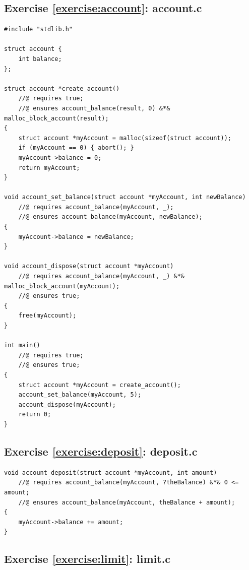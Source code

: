 \documentclass{article}
\begin{document}
\subsection{Exercise \ref{exercise:account}: account.c}

\begin{lstlisting}
#include "stdlib.h"

struct account {
    int balance;
};

struct account *create_account()
    //@ requires true;
    //@ ensures account_balance(result, 0) &*& malloc_block_account(result);
{
    struct account *myAccount = malloc(sizeof(struct account));
    if (myAccount == 0) { abort(); }
    myAccount->balance = 0;
    return myAccount;
}

void account_set_balance(struct account *myAccount, int newBalance)
    //@ requires account_balance(myAccount, _);
    //@ ensures account_balance(myAccount, newBalance);
{
    myAccount->balance = newBalance;
}

void account_dispose(struct account *myAccount)
    //@ requires account_balance(myAccount, _) &*& malloc_block_account(myAccount);
    //@ ensures true;
{
    free(myAccount);
}

int main()
    //@ requires true;
    //@ ensures true;
{
    struct account *myAccount = create_account();
    account_set_balance(myAccount, 5);
    account_dispose(myAccount);
    return 0;
}
\end{lstlisting}

\subsection{Exercise \ref{exercise:deposit}: deposit.c}

\begin{lstlisting}
void account_deposit(struct account *myAccount, int amount)
    //@ requires account_balance(myAccount, ?theBalance) &*& 0 <= amount;
    //@ ensures account_balance(myAccount, theBalance + amount);
{
    myAccount->balance += amount;
}
\end{lstlisting}

\subsection{Exercise \ref{exercise:limit}: limit.c}
\end{document}
